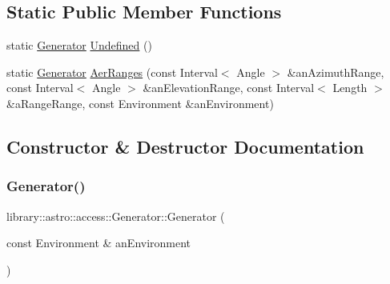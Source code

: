 \subsection*{Static Public Member Functions}
\begin{DoxyCompactItemize}
\item 
static \hyperlink{classlibrary_1_1astro_1_1access_1_1_generator}{Generator} \hyperlink{classlibrary_1_1astro_1_1access_1_1_generator_a772aae06882c9c24c93978ec246bcc83}{Undefined} ()
\item 
static \hyperlink{classlibrary_1_1astro_1_1access_1_1_generator}{Generator} \hyperlink{classlibrary_1_1astro_1_1access_1_1_generator_a51e8191b002ee609db6ce11927281bba}{Aer\+Ranges} (const Interval$<$ Angle $>$ \&an\+Azimuth\+Range, const Interval$<$ Angle $>$ \&an\+Elevation\+Range, const Interval$<$ Length $>$ \&a\+Range\+Range, const Environment \&an\+Environment)
\end{DoxyCompactItemize}


\subsection{Constructor \& Destructor Documentation}
\mbox{\label{classlibrary_1_1astro_1_1access_1_1_generator_a7b07719b1622bb4ffb7fe0d654f91fea}} 
\subsubsection{\texorpdfstring{Generator()}{Generator()}\hspace{0.1cm}{\footnotesize\ttfamily [1/2]}}
{\footnotesize\ttfamily library\+::astro\+::access\+::\+Generator\+::\+Generator (\begin{DoxyParamCaption}\item[{const Environment \&}]{an\+Environment }\end{DoxyParamCaption})}

\mbox{\label{classlibrary_1_1astro_1_1access_1_1_generator_a8a555bd3bd79329602026814955077f7}} 
